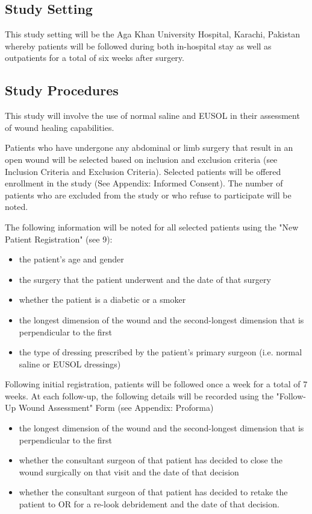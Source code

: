 \documentclass{article}
\begin{document}
\subsection{Study Setting}
This study setting will be the Aga Khan University Hospital, Karachi, Pakistan
whereby patients will be followed during both in-hospital stay as well as
outpatients for a total of six weeks after surgery.

\subsection{Study Procedures}
This study will involve the use of normal saline and EUSOL in their assessment
of wound healing capabilities.

Patients who have undergone any abdominal or limb surgery that result in an open
wound will be selected based on inclusion and exclusion criteria (see Inclusion
Criteria and Exclusion Criteria). Selected patients will be offered enrollment
in the study (See Appendix: Informed Consent). The number of patients who are
excluded from the study or who refuse to participate will be noted.

The following information will be noted for all selected patients using the "New
Patient Registration" (see 9):

\begin{itemize}
\item the patient's age and gender
\item the surgery that the patient underwent and the date of that surgery
\item whether the patient is a diabetic or a smoker
\item the longest dimension of the wound and the second-longest dimension that is perpendicular to the first
\item the type of dressing prescribed by the patient's primary surgeon (i.e. normal saline or EUSOL dressings)
\end{itemize}

Following initial registration, patients will be followed once a week for a
total of 7 weeks. At each follow-up, the following details will be recorded
using the "Follow-Up Wound Assessment" Form (see Appendix: Proforma)

\begin{itemize}
\item the longest dimension of the wound and the second-longest dimension that is perpendicular to the first
\item whether the consultant surgeon of that patient has decided to close the wound surgically on that visit and the date of that decision
\item whether the consultant surgeon of that patient has decided to retake the patient to OR for a re-look debridement and the date of that decision.
\end{itemize}
\end{document}
